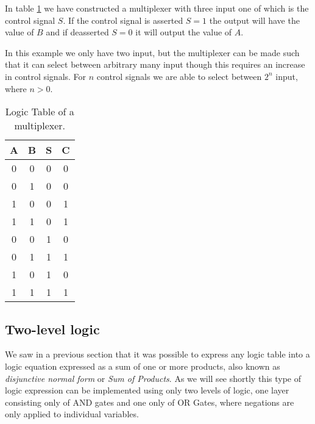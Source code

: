             In table \ref{LogicTable:Multiplexer} we have constructed a multiplexer with three input one of which is the control signal $S$. If the control signal is asserted $S=1$ the output will have the value of $B$ and if deasserted $S=0$ it will output the value of $A$. 
            
            In this example we only have two input, but the multiplexer can be made such that it can select between arbitrary many input though this requires an increase in control signals. For $n$ control signals we are able to select between $2^{n}$ input, where $n > 0$.
            \begin{table}[h!]
                \centering
                \begin{tabular}{|c|c|c||c|}
                	\hline
                	\textbf{A} & \textbf{B} & \textbf{S} & \textbf{C} \\ \hline
                	    0      &     0      &     0      &     0      \\ \hline
                	    0      &     1      &     0      &     0      \\ \hline
                	    1      &     0      &     0      &     1      \\ \hline
                	    1      &     1      &     0      &     1      \\ \hline
                	    0      &     0      &     1      &     0      \\ \hline
                	    0      &     1      &     1      &     1      \\ \hline
                	    1      &     0      &     1      &     0      \\ \hline
                	    1      &     1      &     1      &     1      \\ \hline
                \end{tabular}
                \caption{Logic Table of a multiplexer.}
                \label{LogicTable:Multiplexer}
            \end{table}
        
        \subsection{Two-level logic}
        
            We saw in a previous section that it was possible to express any logic table into a logic equation expressed as a sum of one or more products, also known as \textit{disjunctive normal form} or \textit{Sum of Products}.
            As we will see shortly this type of logic expression can be implemented using only two levels of logic, one layer consisting only of AND gates and one only of OR Gates, where negations are only applied to individual variables.
            
